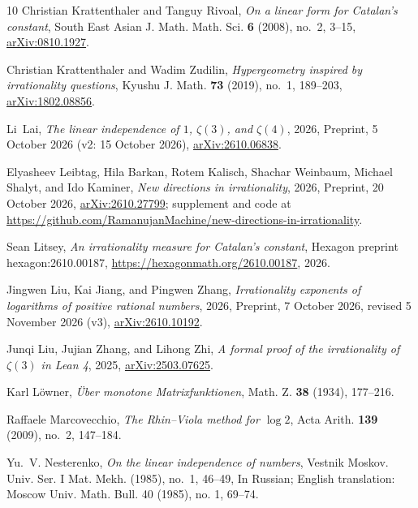 \documentclass[11pt]{amsart}
\theoremstyle{definition}
\theoremstyle{remark}
\numberwithin{equation}{section}
\begin{document}
\begin{thebibliography}{10}
Christian Krattenthaler and Tanguy Rivoal, \emph{On a linear form for
  {C}atalan's constant}, South East Asian J. Math. Math. Sci. \textbf{6}
  (2008), no.~2, 3--15,
  \href{https://arxiv.org/abs/0810.1927}{arXiv:0810.1927}.

Christian Krattenthaler and Wadim Zudilin, \emph{Hypergeometry inspired by
  irrationality questions}, Kyushu J. Math. \textbf{73} (2019), no.~1,
  189--203, \href{https://arxiv.org/abs/1802.08856}{arXiv:1802.08856}.

Li~Lai, \emph{The linear independence of {$1$}, {$\zeta(3)$}, and
  {$\zeta(4)$}}, 2026, Preprint, 5 October 2026 (v2: 15 October 2026),
  \href{https://arxiv.org/abs/2610.06838}{arXiv:2610.06838}.

Elyasheev Leibtag, Hila Barkan, Rotem Kalisch, Shachar Weinbaum, Michael
  Shalyt, and Ido Kaminer, \emph{New directions in irrationality}, 2026,
  Preprint, 20 October 2026,
  \href{https://arxiv.org/abs/2610.27799}{arXiv:2610.27799}; supplement and
  code at
  \url{https://github.com/RamanujanMachine/new-directions-in-irrationality}.

Sean Litsey, \emph{An irrationality measure for {C}atalan's constant}, Hexagon
  preprint hexagon:2610.00187, \url{https://hexagonmath.org/2610.00187}, 2026.

Jingwen Liu, Kai Jiang, and Pingwen Zhang, \emph{Irrationality exponents of
  logarithms of positive rational numbers}, 2026, Preprint, 7 October 2026,
  revised 5 November 2026 (v3),
  \href{https://arxiv.org/abs/2610.10192}{arXiv:2610.10192}.

Junqi Liu, Jujian Zhang, and Lihong Zhi, \emph{A formal proof of the
  irrationality of {$\zeta(3)$} in {L}ean 4}, 2025,
  \href{https://arxiv.org/abs/2503.07625}{arXiv:2503.07625}.

Karl L\"owner, \emph{\"{U}ber monotone {M}atrixfunktionen}, Math. Z.
  \textbf{38} (1934), 177--216.

Raffaele Marcovecchio, \emph{The {R}hin--{V}iola method for {$\log 2$}}, Acta
  Arith. \textbf{139} (2009), no.~2, 147--184.

Yu.~V. Nesterenko, \emph{On the linear independence of numbers}, Vestnik
  Moskov. Univ. Ser. I Mat. Mekh. (1985), no.~1, 46--49, In Russian; English
  translation: Moscow Univ. Math. Bull. 40 (1985), no. 1, 69--74.


\end{thebibliography}
\end{document}
